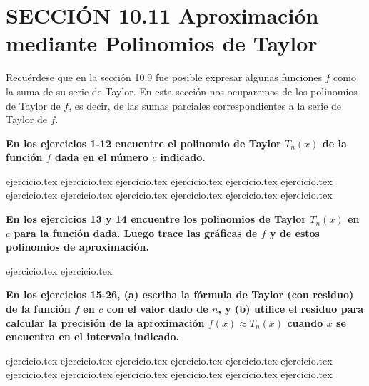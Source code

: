 
\section*{SECCIÓN 10.11 \quad Aproximación mediante Polinomios de Taylor}

Recuérdese que en la sección 10.9 fue posible expresar algunas funciones $f$ como la suma de su serie de Taylor. En esta sección nos ocuparemos de los polinomios de Taylor de $f$, es decir, de las sumas parciales correspondientes a la serie de Taylor de $f$.

\vspace{0.5cm}
\noindent\textbf{En los ejercicios 1-12 encuentre el polinomio de Taylor $T_n(x)$ de la función $f$ dada en el número $c$ indicado.}
\begin{enumerate}
    {ejercicio.tex}
{ejercicio.tex}
{ejercicio.tex}
{ejercicio.tex}
{ejercicio.tex}
{ejercicio.tex}
{ejercicio.tex}
{ejercicio.tex}
{ejercicio.tex}
{ejercicio.tex}
{ejercicio.tex}
{ejercicio.tex}
\end{enumerate}

\vspace{0.3cm}
\noindent\textbf{En los ejercicios 13 y 14 encuentre los polinomios de Taylor $T_n(x)$ en $c$ para la función dada. Luego trace las gráficas de $f$ y de estos polinomios de aproximación.}
\begin{enumerate}
    \setcounter{enumi}{12}
    {ejercicio.tex}
{ejercicio.tex}
\end{enumerate}

\vspace{0.3cm}
\noindent\textbf{En los ejercicios 15-26, (a) escriba la fórmula de Taylor (con residuo) de la función $f$ en $c$ con el valor dado de $n$, y (b) utilice el residuo para calcular la precisión de la aproximación $f(x) \approx T_n(x)$ cuando $x$ se encuentra en el intervalo indicado.}
\begin{enumerate}
    \setcounter{enumi}{14}
    {ejercicio.tex}
{ejercicio.tex}
{ejercicio.tex}
{ejercicio.tex}
{ejercicio.tex}
{ejercicio.tex}
{ejercicio.tex}
{ejercicio.tex}
{ejercicio.tex}
{ejercicio.tex}
{ejercicio.tex}
{ejercicio.tex}
\end{enumerate}


